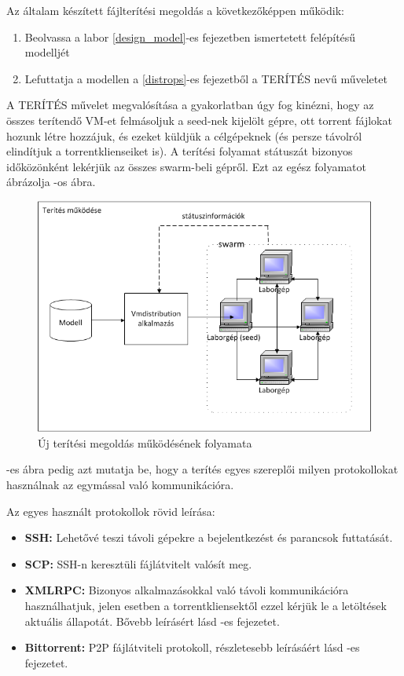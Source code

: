 Az általam készített fájlterítési megoldás a következőképpen működik:

\begin{enumerate}
  \item Beolvassa a labor \ref{design_model}-es fejezetben ismertetett felépítésű modelljét
  \item Lefuttatja a modellen a \ref{distrops}-es fejezetből a TERÍTÉS nevű műveletet
\end{enumerate}

A TERÍTÉS művelet megvalósítása a gyakorlatban úgy fog kinézni, hogy az összes terítendő VM-et felmásoljuk a seed-nek kijelölt gépre, ott torrent fájlokat hozunk létre hozzájuk, és ezeket küldjük a célgépeknek (és persze távolról elindítjuk a torrentklienseiket is). A terítési folyamat státuszát bizonyos időközönként lekérjük az összes swarm-beli gépről. Ezt az egész folyamatot ábrázolja -os ábra.

\begin{figure}[ht]
	\centering
	\includegraphics[width=130mm, keepaspectratio]{figures/design_overview.png}
	\caption{Új terítési megoldás működésének folyamata}
	\label{fig:designoverview}
\end{figure}

-es ábra pedig azt mutatja be, hogy a terítés egyes szereplői milyen protokollokat használnak az egymással való kommunikációra.

Az egyes használt protokollok rövid leírása:

\begin{itemize}
  \item \textbf{SSH}\cite{ylonen2006secure}\textbf{:} Lehetővé teszi távoli gépekre a bejelentkezést és parancsok futtatását.
  \item \textbf{SCP}\cite{pechanec2007scp}\textbf{:} SSH-n keresztüli fájlátvitelt  valósít meg.
  \item \textbf{XMLRPC:} Bizonyos alkalmazásokkal való távoli kommunikációra használhatjuk, jelen esetben a torrentkliensektől ezzel kérjük le a letöltések aktuális állapotát. Bővebb leírásért lásd -es fejezetet.
  \item \textbf{Bittorrent:} P2P fájlátviteli protokoll, részletesebb leírásáért lásd -es fejezetet.
\end{itemize}

